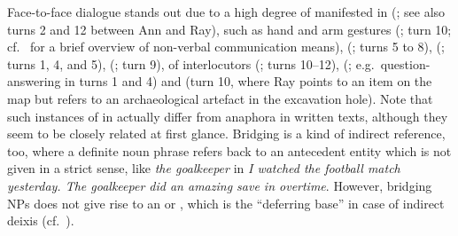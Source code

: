 \documentclass[output=paper
 	        ,biblatex
                ,babelshorthands
                ,newtxmath
                ,draftmode
                ,colorlinks, citecolor=brown
]{langscibook}
\begin{document}
Face-to-face dialogue stands out due to a high degree of  manifested in  (\citealt{Tomasello:1998}; see also turns 2 and 12 between Ann and Ray),  such as hand and arm gestures (\citealt{Kendon:2004,McNeill:2000:a}; turn 10; cf.\  for a brief overview of non-verbal communication means),  (\citealp{Ginzburg:Fernandez:Schlangen:2014}; turns 5 to 8),  (\citealp{Fernandez:Ginzburg:2002,Fernandez:Ginzburg:Lappin:2007}; turns 1, 4, and 5),  (\citealp{Ginzburg:Breitholz:Cooper:Hough:Tian:2015}; turn 9),  of interlocutors (\citealp{Clark:Schreuder:Buttrick:1983}; turns 10--12),  (\citealp{Sacks:Schegloff:Jefferson:1974,heldner2010,levinson2015}; e.g.\ question-answering in turns 1 and 4) and  (turn 10, where Ray points to an item on the map but refers to an archaeological artefact in the excavation hole). Note that such instances of  \citep{Nunberg:1993} in  actually differ from  anaphora \citep{Clark:1975}  in written texts, although they seem to be closely related at first glance. Bridging is a kind of indirect reference, too, where a definite noun phrase refers back to an antecedent entity which is not given in a strict sense, like \textit{the goalkeeper} in \textit{I watched the football match yesterday. The goalkeeper did an amazing save in overtime}. However, bridging NPs does not give rise to an  or , which is the \enquote{deferring base} in case of indirect deixis (cf.\ \citealp{Luecking:2018:a}).
\end{document}
